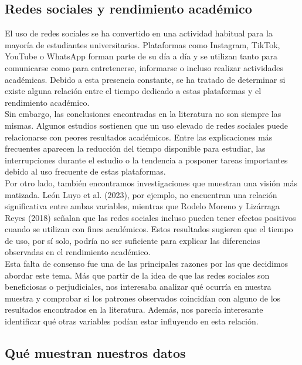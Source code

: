 \documentclass[12pt]{article}
\begin{document}
\subsection{Redes sociales y rendimiento académico}

El uso de redes sociales se ha convertido en una actividad habitual para la mayoría de estudiantes universitarios. Plataformas como Instagram, TikTok, YouTube o WhatsApp forman parte de su día a día y se utilizan tanto para comunicarse como para entretenerse, informarse o incluso realizar actividades académicas. Debido a esta presencia constante, se ha tratado de determinar si existe alguna relación entre el tiempo dedicado a estas plataformas y el rendimiento académico.
\\

Sin embargo, las conclusiones encontradas en la literatura no son siempre las mismas. Algunos estudios sostienen que un uso elevado de redes sociales puede relacionarse con peores resultados académicos. Entre las explicaciones más frecuentes aparecen la reducción del tiempo disponible para estudiar, las interrupciones durante el estudio o la tendencia a posponer tareas importantes debido al uso frecuente de estas plataformas.
\\

Por otro lado, también encontramos investigaciones que muestran una visión más matizada. León Luyo et al. (2023), por ejemplo, no encuentran una relación significativa entre ambas variables, mientras que Rodelo Moreno y Lizárraga Reyes (2018) señalan que las redes sociales incluso pueden tener efectos positivos cuando se utilizan con fines académicos. Estos resultados sugieren que el tiempo de uso, por sí solo, podría no ser suficiente para explicar las diferencias observadas en el rendimiento académico.
\\

Esta falta de consenso fue una de las principales razones por las que decidimos abordar este tema. Más que partir de la idea de que las redes sociales son beneficiosas o perjudiciales, nos interesaba analizar qué ocurría en nuestra muestra y comprobar si los patrones observados coincidían con alguno de los resultados encontrados en la literatura. Además, nos parecía interesante identificar qué otras variables podían estar influyendo en esta relación.

\subsection{Qué muestran nuestros datos}
\end{document}
